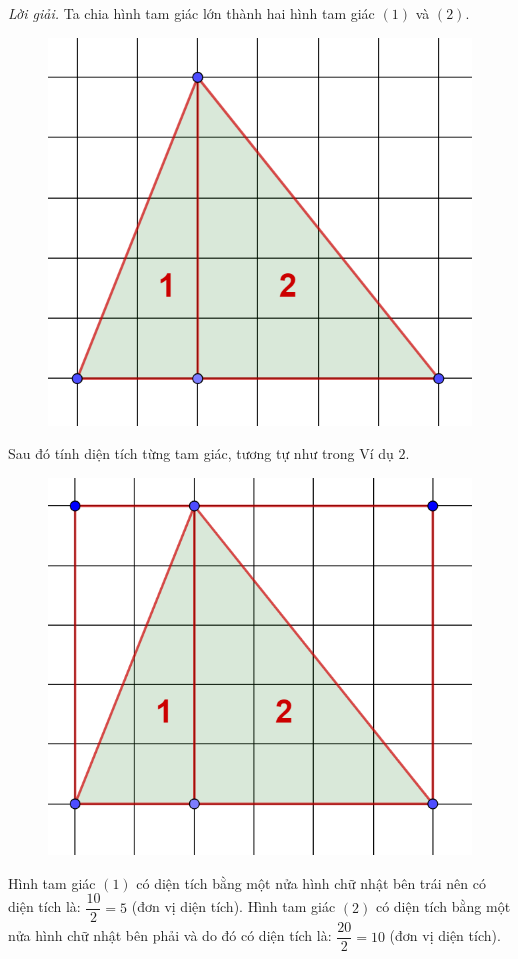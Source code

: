 \begin{multicols}{2}
\begin{figure}[H]
		\vspace*{-10pt}
	\end{figure}
	\textit{Lời giải.} Ta chia hình tam giác lớn thành hai hình tam giác $(1)$ và $(2)$.
	\begin{figure}[H]
		\centering
		\vspace*{-5pt}
		\captionsetup{labelformat= empty, justification=centering}
		\includegraphics[width=0.55\linewidth]{6}
		\vspace*{-10pt}
	\end{figure}
	Sau đó tính diện tích từng tam giác, tương tự như trong Ví dụ $2$.
	\begin{figure}[H]
		\centering
		\vspace*{-5pt}
		\captionsetup{labelformat= empty, justification=centering}
		\includegraphics[width=0.55\linewidth]{7}
		\vspace*{-10pt}
	\end{figure}
	Hình tam giác $(1)$ có diện tích bằng một nửa hình chữ nhật bên trái nên có diện tích là: $\dfrac{10}{2}=5$ (đơn vị diện tích).
	\vskip 0.1cm
	Hình tam giác $(2)$ có diện tích bằng một nửa hình chữ nhật bên phải và do đó có diện tích là: $\dfrac{20}{2}=10$ (đơn vị diện tích).

\end{multicols}
